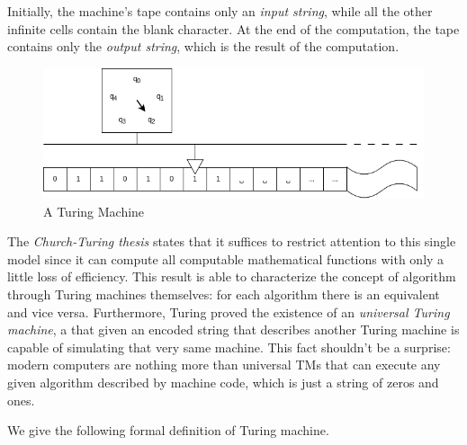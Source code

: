Initially, the machine's tape contains only an \textit{input string}, while all the other infinite cells contain the blank character. At the end of the computation, the tape contains only the \textit{output string}, which is the result of the computation.

\begin{figure}[H]
    \centering
    \includegraphics[scale=0.5]{resources/images/tm.png}

    \caption{A Turing Machine}
\end{figure}

The \textit{Church-Turing thesis} states that it suffices to restrict attention to this single model since it can compute all computable mathematical functions with only a little loss of efficiency. This result is able to characterize the concept of algorithm through Turing machines themselves: for each algorithm there is an equivalent \TM and vice versa. Furthermore, Turing proved the existence of an \textit{universal Turing machine}, a \TM that given an encoded string that describes another Turing machine is capable of simulating that very same machine. This fact shouldn't be a surprise: modern computers are nothing more than universal \textsf{TM}s that can execute any given algorithm described by machine code, which is just a string of zeros and ones.

We give the following formal definition of Turing machine.

